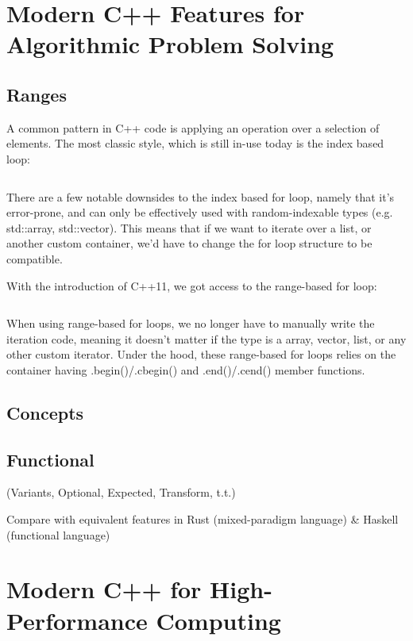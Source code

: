 \documentclass[
    english, %
]{VUMIFPSkursinis}
\begin{document}
\section{Modern C++ Features for Algorithmic Problem Solving}

\subsection{Ranges}

A common pattern in C++ code is applying an operation over a selection of elements. The most classic style, which is still in-use today is the index based loop:
\inputminted[]{C++}{./source_code/ranges_loop_index.cpp}
There are a few notable downsides to the index based for loop, namely that it's error-prone, and can only be effectively used with random-indexable types (e.g. std::array, std::vector).
This means that if we want to iterate over a list, or another custom container, we'd have to change the for loop structure to be compatible.


With the introduction of C++11, we got access to the range-based for loop:
\inputminted[]{C++}{./source_code/ranges_loop_range.cpp}
When using range-based for loops, we no longer have to manually write the iteration code, meaning it doesn't matter if the type is a array, vector, list, or any other custom iterator.
Under the hood, these range-based for loops relies on the container having .begin()/.cbegin() and .end()/.cend() member functions.


\subsection{Concepts}
\subsection{Functional}
(Variants, Optional, Expected, Transform, t.t.)

Compare with equivalent features in Rust (mixed-paradigm language) \& Haskell (functional language)

\section{Modern C++ for High-Performance Computing}
\end{document}
